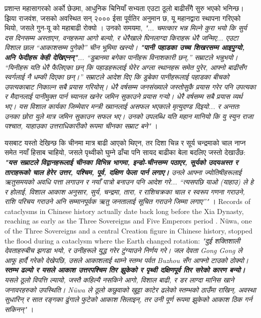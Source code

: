 \documentclass[10pt,twocolumn,letterpaper]{article}
\begin{document}
प्रशान्त महासागरको अर्को छेउमा, आधुनिक चिनियाँ सभ्यता एउटा ठूलो बाढीसँगै सुरु भएको भनिन्छ। झिया राजवंश, जसको अवस्थित सन् २००० ईसा पूर्वतिर अनुमान छ, यू महानद्वारा स्थापना गरिएको थियो, जसले गुन-यू को महाबाढी रोक्यो \cite{6}। उनको समयमा, \textit{"... चमत्कार भन्न मिल्ने कुरा भयो कि सुर्य दस दिनसम्म अस्ताएन, वनहरूमा आगो बल्यो, र धेरैखाले घिनलाग्दा किराहरू धेरै जन्मिए... एउटा विशाल छाल “आकाशसम्म पुगेको” चीन भूमिमा खस्यो। \textbf{"पानी पहाडका उच्च शिखरसम्म आइपुग्यो, अनि फेदीहरू केही देखिएनन्"}... “डुबानमा बगेका पानीहरू विनाशकारी छन्,” सम्राटले भन्नुभयो। “यिनीहरू यति धेरै फैलिएका छन् कि पहाडहरूलाई घेरेर अग्ला स्थानहरू समेत पुरेर, आफ्नो बाढीसँग स्वर्गलाई नै धम्की दिएका छन्।” सम्राटले आदेश दिए कि डुबेका पानीहरूलाई पहाडका बीचको उपत्यकाबाट निकाल्न सबै प्रयास गरियोस्। धेरै वर्षसम्म जनसंख्याले जस्तोसुकै प्रयास गरेर पनि उपत्यका र मैदानलाई पानीमुक्त पार्न च्यानल खनेर जमिन सुकाउने प्रयास गर्‍यो। धेरै वर्षसम्म सबै प्रयास व्यर्थ भए। यस विशाल कार्यका जिम्मेवार मन्त्री ख्वानलाई असफल भएकाले मृत्युदण्ड दिइयो... र अन्ततः उनका छोरा युले मात्र जमिन सुकाउन सफल भए। उनको उपलब्धि यति महान मानियो कि यु स्युन राजा पश्चात, याहाउका उत्तराधिकारीको रूपमा चीनका सम्राट बने"} \cite{5}।

यसबाट यस्तो देखिन्छ कि चीनमा मात्र बाढी आएको थिएन, तर दिशा चिन्न र सूर्य चन्द्रमाको चाल नाप्न समेत नयाँ हिसाब चाहियो, जसले पृथ्वीको घुम्ने ढाँचा पनि सायद बाढीका बेला बदलिए जस्तो देखाउँछ: \textit{\textbf{"यस सम्राटले विद्वानहरूलाई चीनका विभिन्न भागमा, इन्डो-चीनसम्म पठाएर, सूर्यको उदयअस्त र ताराहरूको चाल हेरेर उत्तर, पश्चिम, पूर्व, दक्षिण फेला पार्न लगाए।} उनले आफ्ना ज्योतिषीहरूलाई ऋतुसमयको अवधि पत्ता लगाउन र नयाँ पात्रो बनाउन पनि आदेश गरे... “त्यसपछि याओ (याहाउ) ले हे र होलाई, विशाल आकाश अनुसार, सुर्य, चन्द्रमा, तारा, र राशिचक्रका चाल र स्वरूप गणना गराउने, राशि परिचय गराउने अनि सम्मानपूर्वक ऋतु जनतालाई सूचित गराउने जिम्मा लगाए”"} \cite{5}।
Records of cataclysms in Chinese history actually date back long before the Xia Dynasty, reaching as early as the Three Sovereigns and Five Emperors period \cite{7}. Nüwa, one of the Three Sovereigns and a central Creation figure in Chinese history, stopped the flood during a cataclysm where the Earth changed rotation: \textit{"दुई शक्तिशाली देवताहरुबीच झगडा भयो, र उनीहरूले युद्ध गरेर टुंग्याउने निर्णय गरे। जल देवता Gong Gong ले आफू हार्दै गरेको देखेपछि, उसले आकाशलाई थाम्ने स्तम्भ पर्वत Buzhou सँग आफ्नो टाउको ठोक्यो। \textbf{स्तम्भ ढल्यो र यसले आकाश उत्तरपश्चिम तिर झुकेको र पृथ्वी दक्षिणपूर्व तिर सरेको कारण बन्यो।} यसले ठूलो विपत्ति ल्यायो, जस्तै कहिल्यै नसकिने आगो, विशाल बाढी, र डर लाग्दा मानिस खाने जनावरहरुको उपस्थिति। Nüwa ले ठूलो कछुवाको खुट्टा काटेर ढलेको स्तम्भको ठाउँमा राखिन्, अवस्था सुधारिन् र सात रङ्गका ढुंगाले फुटेको आकाश सिलाइन्, तर उनी पूर्ण रूपमा झुकेको आकाश ठिक गर्न सकिनन्"} \cite{8}।
\end{document}
